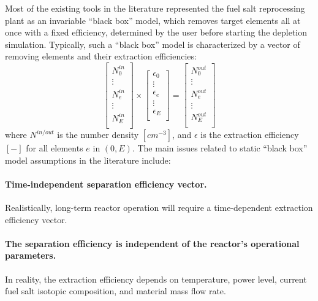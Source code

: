 Most of the existing tools in the literature represented the fuel salt 
reprocessing plant as an invariable ``black box'' model, which removes target 
elements all at once with a fixed efficiency, determined by the user before 
starting the depletion simulation. Typically, such a ``black box'' model is 
characterized by a vector of removing elements and their extraction 
efficiencies:
\begin{equation}
\begin{bmatrix}
N^{in}_{0} \\ \vdots \\ N^{in}_{e} \\ \vdots \\ N^{in}_{E} \\
\end{bmatrix} 
\times
\begin{bmatrix}
\epsilon_{0} \\ \vdots \\ \epsilon_{e} \\ \vdots \\ \epsilon_{E} \\
\end{bmatrix} =
\begin{bmatrix}
N^{out}_{0}\\ \vdots \\ N^{out}_{e} \\ \vdots \\N^{out}_{E}  \\
\end{bmatrix}
\end{equation}
where $N^{in/out}$ is the number density $[cm^{-3}]$, and 
$\epsilon$ is the extraction efficiency $[-]$ for all elements $e$ in $(0, 
E)$. The main issues related to static ``black box'' model assumptions in the 
literature include: 
\paragraph{Time-independent separation efficiency vector.} Realistically, 
long-term reactor operation will require a time-dependent extraction 
efficiency vector.
\paragraph{The separation efficiency is independent of the reactor's 
operational parameters.} In reality, the extraction efficiency depends on 
temperature, power level, current fuel salt isotopic composition, and material 
mass flow rate.
